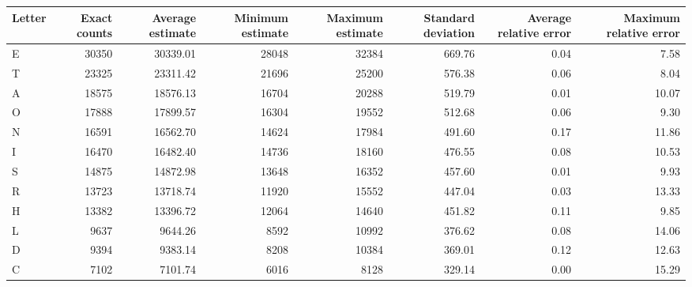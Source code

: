 \begin{tabular}{lrrrrrrr}
\toprule
Letter &  Exact counts &  Average estimate &  Minimum estimate &  Maximum estimate &  Standard deviation &  Average relative error &  Maximum relative error \\
\midrule
     E &         30350 &          30339.01 &             28048 &             32384 &              669.76 &                    0.04 &                    7.58 \\
     T &         23325 &          23311.42 &             21696 &             25200 &              576.38 &                    0.06 &                    8.04 \\
     A &         18575 &          18576.13 &             16704 &             20288 &              519.79 &                    0.01 &                   10.07 \\
     O &         17888 &          17899.57 &             16304 &             19552 &              512.68 &                    0.06 &                    9.30 \\
     N &         16591 &          16562.70 &             14624 &             17984 &              491.60 &                    0.17 &                   11.86 \\
     I &         16470 &          16482.40 &             14736 &             18160 &              476.55 &                    0.08 &                   10.53 \\
     S &         14875 &          14872.98 &             13648 &             16352 &              457.60 &                    0.01 &                    9.93 \\
     R &         13723 &          13718.74 &             11920 &             15552 &              447.04 &                    0.03 &                   13.33 \\
     H &         13382 &          13396.72 &             12064 &             14640 &              451.82 &                    0.11 &                    9.85 \\
     L &          9637 &           9644.26 &              8592 &             10992 &              376.62 &                    0.08 &                   14.06 \\
     D &          9394 &           9383.14 &              8208 &             10384 &              369.01 &                    0.12 &                   12.63 \\
     C &          7102 &           7101.74 &              6016 &              8128 &              329.14 &                    0.00 &                   15.29 \\

\end{tabular}
